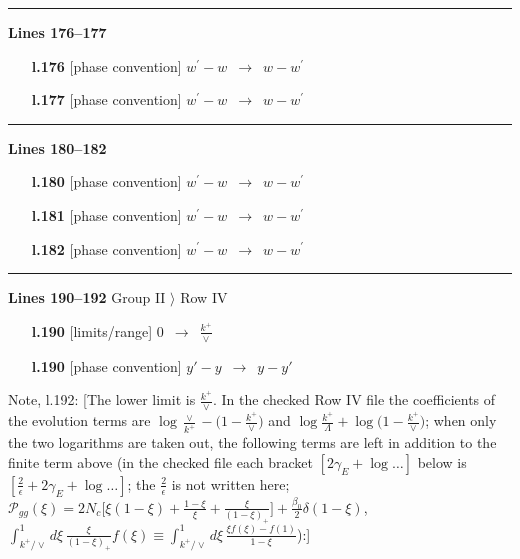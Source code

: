 \documentclass[10pt]{article}
\newenvironment{notebox}{\def\FrameCommand{{\color{notebar}\vrule width 1.5pt}\hspace{6pt}}\MakeFramed{\advance\hsize-\width\FrameRestore}\small}{\endMakeFramed}
\begin{document}
\noindent\rule{\linewidth}{0.3pt}\par\noindent\textbf{Lines 176--177} \par
\begin{itemize}[leftmargin=2.2em,itemsep=1pt,topsep=2pt]
\item[\textbf{l.176}] \textsf{\small [phase convention]} $\displaystyle w^{\prime}-w$\ $\longrightarrow$\ $\displaystyle w-w^{\prime}$
\item[\textbf{l.177}] \textsf{\small [phase convention]} $\displaystyle w^{\prime}-w$\ $\longrightarrow$\ $\displaystyle w-w^{\prime}$
\end{itemize}
\noindent\rule{\linewidth}{0.3pt}\par\noindent\textbf{Lines 180--182} \par
\begin{itemize}[leftmargin=2.2em,itemsep=1pt,topsep=2pt]
\item[\textbf{l.180}] \textsf{\small [phase convention]} $\displaystyle w^{\prime}-w$\ $\longrightarrow$\ $\displaystyle w-w^{\prime}$
\item[\textbf{l.181}] \textsf{\small [phase convention]} $\displaystyle w^{\prime}-w$\ $\longrightarrow$\ $\displaystyle w-w^{\prime}$
\item[\textbf{l.182}] \textsf{\small [phase convention]} $\displaystyle w^{\prime}-w$\ $\longrightarrow$\ $\displaystyle w-w^{\prime}$
\end{itemize}
\noindent\rule{\linewidth}{0.3pt}\par\noindent\textbf{Lines 190--192} \quad \textsf{Group II $\rangle$ Row IV} \par
\begin{itemize}[leftmargin=2.2em,itemsep=1pt,topsep=2pt]
\item[\textbf{l.190}] \textsf{\small [limits/range]} $\displaystyle 0$\ $\longrightarrow$\ $\displaystyle \frac{k^{+}}{\vee}$
\item[\textbf{l.190}] \textsf{\small [phase convention]} $\displaystyle y'-y$\ $\longrightarrow$\ $\displaystyle y-y'$
\end{itemize}
\begin{notebox}\textsf{\small Note, l.192:} [The lower limit is $\frac{k^{+}}{\vee}$. In the checked Row IV file the coefficients of the evolution terms are $\log\frac{\vee}{k^{+}}-\big(1-\frac{k^{+}}{\vee}\big)$ and $\log\frac{k^{+}}{\Lambda}+\log\big(1-\frac{k^{+}}{\vee}\big)$; when only the two logarithms are taken out, the following terms are left in addition to the finite term above (in the checked file each bracket $[2\gamma_{E}+\log\dots]$ below is $[\frac{2}{\epsilon}+2\gamma_{E}+\log\dots]$; the $\frac{2}{\epsilon}$ is not written here; $\mathcal P_{gg}(\xi)=2N_{c}\big[\xi(1-\xi)+\frac{1-\xi}{\xi}+\frac{\xi}{(1-\xi)_{+}}\big]+\frac{\beta_{0}}{2}\delta(1-\xi)$, $\int_{k^{+}/\vee}^{1}d\xi\,\frac{\xi}{(1-\xi)_{+}}f(\xi)\equiv\int_{k^{+}/\vee}^{1}d\xi\,\frac{\xi f(\xi)-f(1)}{1-\xi}$):]\end{notebox}
\end{document}
